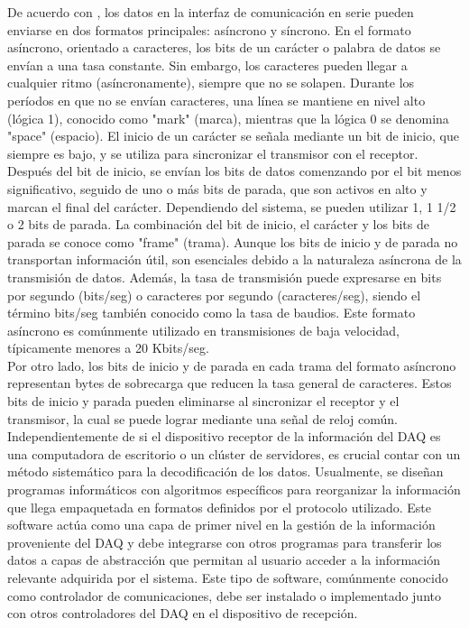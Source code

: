 \documentclass{report}
\begin{document}
 \noindent De acuerdo con \cite{eeeguide_serial_communication_8251}, los datos en la interfaz de comunicación en serie pueden enviarse en dos formatos principales: asíncrono y síncrono. En el formato asíncrono, orientado a caracteres, los bits de un carácter o palabra de datos se envían a una tasa constante. Sin embargo, los caracteres pueden llegar a cualquier ritmo (asíncronamente), siempre que no se solapen. Durante los períodos en que no se envían caracteres, una línea se mantiene en nivel alto (lógica 1), conocido como "mark" (marca), mientras que la lógica 0 se denomina "space" (espacio). El inicio de un carácter se señala mediante un bit de inicio, que siempre es bajo, y se utiliza para sincronizar el transmisor con el receptor. Después del bit de inicio, se envían los bits de datos comenzando por el bit menos significativo, seguido de uno o más bits de parada, que son activos en alto y marcan el final del carácter. Dependiendo del sistema, se pueden utilizar 1, 1 1/2 o 2 bits de parada. La combinación del bit de inicio, el carácter y los bits de parada se conoce como "frame" (trama). Aunque los bits de inicio y de parada no transportan información útil, son esenciales debido a la naturaleza asíncrona de la transmisión de datos. Además, la tasa de transmisión puede expresarse en bits por segundo (bits/seg) o caracteres por segundo (caracteres/seg), siendo el término bits/seg también conocido como la tasa de baudios. Este formato asíncrono es comúnmente utilizado en transmisiones de baja velocidad, típicamente menores a 20 Kbits/seg.\\

\noindent Por otro lado, los bits de inicio y de parada en cada trama del formato asíncrono representan bytes de sobrecarga que reducen la tasa general de caracteres. Estos bits de inicio y parada pueden eliminarse al sincronizar el receptor y el transmisor, la cual se puede lograr mediante una señal de reloj común.\\

\noindent Independientemente de si el dispositivo receptor de la información del DAQ es una computadora de escritorio o un clúster de servidores, es crucial contar con un método sistemático para la decodificación de los datos. Usualmente, se diseñan programas informáticos con algoritmos específicos para reorganizar la información que llega empaquetada en formatos definidos por el protocolo utilizado. Este software actúa como una capa de primer nivel en la gestión de la información proveniente del DAQ y debe integrarse con otros programas para transferir los datos a capas de abstracción que permitan al usuario acceder a la información relevante adquirida por el sistema. Este tipo de software, comúnmente conocido como controlador de comunicaciones, debe ser instalado o implementado junto con otros controladores del DAQ en el dispositivo de recepción.\\
\end{document}
